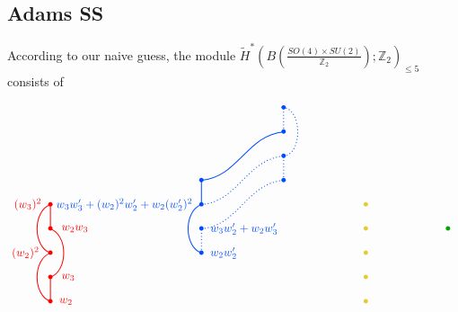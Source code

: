 \documentclass[12pt]{article}
\numberwithin{equation}{section}
\newcommand*{\colorA}[1]{\textcolor{colorA}{#1}}
\newcommand*{\colorB}[1]{\textcolor{colorB}{#1}}
\newcommand*{\colorC}[1]{\textcolor{colorC}{#1}}
\newcommand*{\colorD}[1]{\textcolor{colorD}{#1}}
\def\bZ{\mathbb{Z}}
\begin{document}
\subsection{Adams SS}
According to our naive guess, the module $\widetilde H^\ast(B\left(\tfrac{SO(4)\times SU(2)}{\bZ_2}\right);\bZ_2)_{\leq 5}$ consists of
\begin{equation}
	\begin{tikzpicture}[thick,baseline=(m-2-4.south)]
		\matrix (m) [
			matrix of math nodes,
			row sep= 1em,
			column sep=6em,
		]{
			&&& \colorB{\bullet}\\
			&&& \colorB{\bullet}\\
			&&& \colorB{\bullet}\\
			&& \colorB{\bullet} & \colorB{\bullet}\\
			\colorA{\bullet} && \colorB{\bullet} && \colorC{\bullet}\\
		    \colorA{\bullet} && \colorB{\bullet} && \colorC{\bullet} & \colorD{\bullet}\\
			\colorA{\bullet} && \colorB{\bullet} && \colorC{\bullet}\\
			\colorA{\bullet} &&&& \colorC{\bullet}\\
			\colorA{\bullet} &&&& \colorC{\bullet}\\
		};
		\draw[colorA] (m-7-1.center) to [out=200, in=160] (m-9-1.center);
		\draw[colorA] (m-9-1.center) to (m-8-1.center);
		\draw[colorA] (m-5-1.center) to [out=200, in=160] (m-7-1.center);
		\draw[colorA] (m-6-1.center) to (m-5-1.center);
		\draw[colorA] (m-6-1.center) to [out=340, in=20] (m-8-1.center);
		\node[colorA, right=4pt] at (m-9-1) {$w_2$};
		\node[colorA, right=6pt] at (m-8-1) {$w_3$};
		\node[colorA, left=6pt] at (m-7-1) {$(w_2)^2$};
		\node[colorA, right=6pt] at (m-6-1) {$w_2w_3$};
		\node[colorA, left=4pt] at (m-5-1) {$(w_3)^2$};
		\draw[colorB] (m-7-3.center) to [out=160, in=200] (m-5-3.center);
		\draw[colorB, dotted] (m-7-3.center) to (m-6-3.center);
		\draw[colorB, dotted] (m-6-3.center) to [out=5, in=185] (m-4-4.center);
		\draw[colorB] (m-5-3.center) to (m-4-3.center);
		\draw[colorB, dotted] (m-5-3.center) to [out=5, in=185] (m-3-4.center);
		\draw[colorB, dotted] (m-4-4.center) to (m-3-4.center);
		\draw[colorB] (m-4-3.center) to [out=5, in=185] (m-2-4.center);
		\draw[colorB, dotted] (m-2-4.center) to (m-1-4.center);
		\draw[colorB, dotted] (m-3-4.center) to [out=5, in=355] (m-1-4.center);
		\node[colorB, right=4pt] at (m-7-3) {$w_2w'_2$};
		\node[colorB, right=4pt] at (m-6-3) {$w_3w'_2 + w_2w'_3$};
		\node[colorB, left=4pt] at (m-5-3) {$w_3w'_3 + (w_2)^2w'_2 + w_2(w'_2)^2$};

\end{tikzpicture}
\end{equation}
\end{document}
